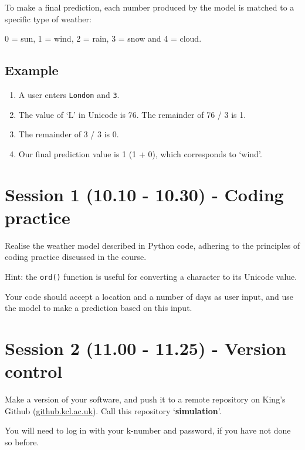 \documentclass{article}
\begin{document}
To make a final prediction, each number produced by the model is matched
to a specific type of weather:

0 = sun, 1 = wind, 2 = rain, 3 = snow and 4 = cloud.

\subsection{Example}

\begin{enumerate}

    \item A user enters \texttt{London} and
    \texttt{3}.

    \item The value of `L' in Unicode is 76. The remainder of 76 / 3 is 1.

    \item The remainder of 3 / 3 is 0.

    \item Our final prediction value is 1 (1 + 0), which corresponds to
    `wind'.

\end{enumerate}

\section{Session 1 (10.10 - 10.30) - Coding practice}

Realise the weather model described in Python code, adhering to the
principles of coding practice discussed in the course.

Hint: the \texttt{ord()} function is useful for
converting a character to its Unicode value.

Your code should accept a location and a number of days as user input,
and use the model to make a prediction based on this input.

\section{Session 2 (11.00 - 11.25) - Version control}

Make a version of your software, and push it to a remote repository
on King's Github (\href{https://github.kcl.ac.uk/}{github.kcl.ac.uk}).
Call this repository `\textbf{simulation}'.

You will need to log in with your k-number and password, if you have
not done so before.
\end{document}
